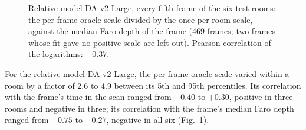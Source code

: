\begin{figure}[t]
\centering
{}
\caption{Relative model DA-v2 Large, every fifth frame of the six test rooms: the per-frame oracle scale divided by
the once-per-room scale, against the median Faro depth of the frame (469 frames; two frames whose fit gave no positive
scale are left out). Pearson correlation of the logarithms: $-0.37$.}
\label{fig:scalevsdepth}
\end{figure}

For the relative model DA-v2 Large, the per-frame oracle scale varied within a room by a factor of 2.6 to 4.9 between
its 5th and 95th percentiles. Its correlation with the frame's time in the scan ranged from $-0.40$ to $+0.30$, positive
in three rooms and negative in three; its correlation with the frame's median Faro depth ranged from $-0.75$ to
$-0.27$, negative in all six (Fig.~\ref{fig:scalevsdepth}).

